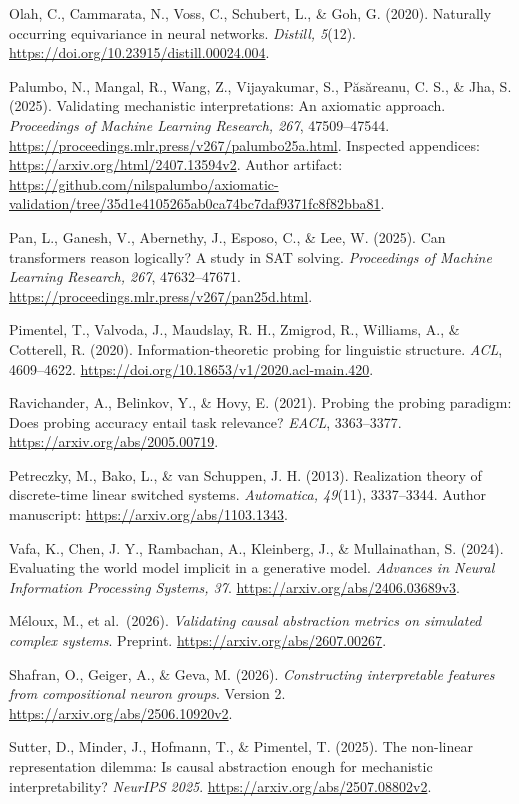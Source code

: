 \documentclass[
  british,
  11pt,
  a4paper,
]{article}
\begin{document}
Olah, C., Cammarata, N., Voss, C., Schubert, L., \& Goh, G. (2020).
Naturally occurring equivariance in neural networks. \emph{Distill,
5}(12). \url{https://doi.org/10.23915/distill.00024.004}.

Palumbo, N., Mangal, R., Wang, Z., Vijayakumar, S., Păsăreanu, C. S., \&
Jha, S. (2025). Validating mechanistic interpretations: An axiomatic
approach. \emph{Proceedings of Machine Learning Research, 267},
47509--47544. \url{https://proceedings.mlr.press/v267/palumbo25a.html}.
Inspected appendices: \url{https://arxiv.org/html/2407.13594v2}. Author
artifact:
\url{https://github.com/nilspalumbo/axiomatic-validation/tree/35d1e4105265ab0ca74bc7daf9371fc8f82bba81}.

Pan, L., Ganesh, V., Abernethy, J., Esposo, C., \& Lee, W. (2025). Can
transformers reason logically? A study in SAT solving. \emph{Proceedings
of Machine Learning Research, 267}, 47632--47671.
\url{https://proceedings.mlr.press/v267/pan25d.html}.

Pimentel, T., Valvoda, J., Maudslay, R. H., Zmigrod, R., Williams, A.,
\& Cotterell, R. (2020). Information-theoretic probing for linguistic
structure. \emph{ACL}, 4609--4622.
\url{https://doi.org/10.18653/v1/2020.acl-main.420}.

Ravichander, A., Belinkov, Y., \& Hovy, E. (2021). Probing the probing
paradigm: Does probing accuracy entail task relevance? \emph{EACL},
3363--3377. \url{https://arxiv.org/abs/2005.00719}.

Petreczky, M., Bako, L., \& van Schuppen, J. H. (2013). Realization
theory of discrete-time linear switched systems. \emph{Automatica,
49}(11), 3337--3344. Author manuscript:
\url{https://arxiv.org/abs/1103.1343}.

Vafa, K., Chen, J. Y., Rambachan, A., Kleinberg, J., \& Mullainathan, S.
(2024). Evaluating the world model implicit in a generative model.
\emph{Advances in Neural Information Processing Systems, 37}.
\url{https://arxiv.org/abs/2406.03689v3}.

Méloux, M., et al.~(2026). \emph{Validating causal abstraction metrics
on simulated complex systems}. Preprint.
\url{https://arxiv.org/abs/2607.00267}.

Shafran, O., Geiger, A., \& Geva, M. (2026). \emph{Constructing
interpretable features from compositional neuron groups}. Version 2.
\url{https://arxiv.org/abs/2506.10920v2}.

Sutter, D., Minder, J., Hofmann, T., \& Pimentel, T. (2025). The
non-linear representation dilemma: Is causal abstraction enough for
mechanistic interpretability? \emph{NeurIPS 2025}.
\url{https://arxiv.org/abs/2507.08802v2}.
\end{document}
